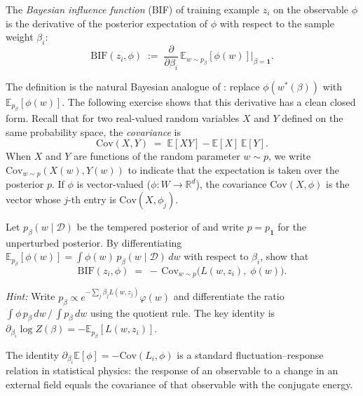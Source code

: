 \documentclass[11pt]{article}
\newcommand{\R}{\mathbb{R}}
\newcommand{\E}{\mathbb{E}}
\begin{document}
\begin{definition}\label{def:bif}
The \emph{Bayesian influence function} (BIF) of training example $z_i$ on the observable $\phi$ is the derivative of the posterior expectation of $\phi$ with respect to the sample weight $\beta_i$:
\[
  \mathrm{BIF}(z_i,\phi) \;:=\; \frac{\partial}{\partial\beta_i}\,\E_{w\sim p_\beta}[\phi(w)]\bigg\rvert_{\beta=\mathbf{1}}.
\]
\end{definition}

The definition is the natural Bayesian analogue of : replace $\phi(w^*(\beta))$ with $\E_{p_\beta}[\phi(w)]$. The following exercise shows that this derivative has a clean closed form. Recall that for two real-valued random variables $X$ and $Y$ defined on the same probability space, the \emph{covariance} is
\[
  \mathrm{Cov}(X,Y) \;=\; \E[XY] - \E[X]\,\E[Y].
\]
When $X$ and $Y$ are functions of the random parameter $w\sim p$, we write $\mathrm{Cov}_{w\sim p}(X(w),Y(w))$ to indicate that the expectation is taken over the posterior $p$. If $\phi$ is vector-valued ($\phi:W\to\R^d$), the covariance $\mathrm{Cov}(X,\phi)$ is the vector whose $j$-th entry is $\mathrm{Cov}(X,\phi_j)$.

\begin{exercise}\label{ex:bif-covariance}
Let $p_\beta(w\mid\mathcal{D})$ be the tempered posterior of  and write $p = p_{\mathbf{1}}$ for the unperturbed posterior. By differentiating $\E_{p_\beta}[\phi(w)] = \int \phi(w)\,p_\beta(w\mid\mathcal{D})\,dw$ with respect to $\beta_i$, show that
\begin{equation}\label{eq:bif-covariance}
  \boxed{\;\mathrm{BIF}(z_i,\phi) \;=\; -\,\mathrm{Cov}_{w\sim p}\bigl(L(w,z_i),\;\phi(w)\bigr).\;}
\end{equation}

\emph{Hint:} Write $p_\beta \propto e^{-\sum_j \beta_j L(w,z_j)}\varphi(w)$ and differentiate the ratio $\int \phi\, p_\beta\,dw \,/\, \int p_\beta\,dw$ using the quotient rule. The key identity is $\partial_{\beta_i}\log Z(\beta) = -\E_{p_\beta}[L(w,z_i)]$.
\end{exercise}

\begin{remark}\label{rem:stat-phys}
The identity $\partial_{\beta_i}\E[\phi] = -\mathrm{Cov}(L_i,\phi)$ is a standard fluctuation--response relation in statistical physics: the response of an observable to a change in an external field equals the covariance of that observable with the conjugate energy.
\end{remark}
\end{document}
